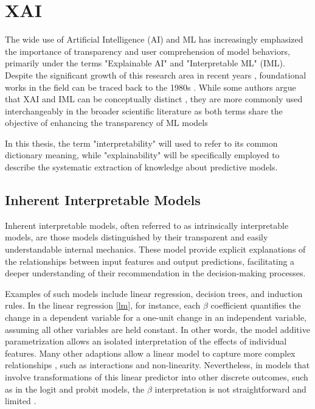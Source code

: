 \section{XAI}

The wide use of Artificial Intelligence (AI) and ML has increasingly emphasized the importance of transparency and user comprehension of model behaviors, primarily under the terms "Explainable AI" and "Interpretable ML" (IML). Despite the significant growth of this research area in recent years \cite{Arya2019OneTechniques}, foundational works in the field can be traced back to the 1980s \cite{Fagant1980COMPUTER-BASEDVM, Bareiss1988Protos:Apprentice}. While some authors argue that XAI and IML can be conceptually distinct \cite{Watson2022ConceptualLearning}, they are more commonly used interchangeably in the broader scientific literature as both terms share the objective of enhancing the transparency of ML models \cite{Molnar2022Model-agnosticLearning}

In this thesis, the term "interpretability" will used to refer to its common dictionary meaning, while "explainability" will be specifically employed to describe the systematic extraction of knowledge about predictive models. 

\subsection{Inherent Interpretable Models}

Inherent interpretable models, often referred to as intrinsically interpretable models, are those models distinguished by their transparent and easily understandable internal mechanics. These model provide explicit explanations of the relationships between input features and output predictions, facilitating a deeper understanding of their recommendation in the decision-making processes. 

Examples of such models include linear regression, decision trees, and induction rules. In the linear regression \ref{lm}, for instance, each $\beta$ coefficient quantifies the change in a dependent variable for a one-unit change in an independent variable, assuming all other variables are held constant. In other words, the model additive parametrization allows an isolated interpretation of the effects of individual features. Many other adaptions allow a linear model to capture more complex relationships \cite{TrevorHastieRobertTibshirani2014AssessmentSelection}, such as interactions and non-linearity. Nevertheless, in models that involve transformations of this linear predictor into other discrete outcomes, such as in the logit and probit models, the $\beta$ interpretation is not straightforward and limited \cite{Mood2017LogisticHeterogeneity, long1997regression}. 

